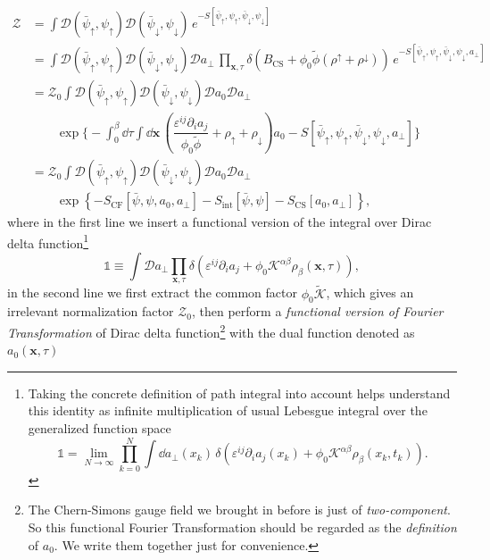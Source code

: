 \documentclass[bachelor,english,numbers]{ustcthesis}
\begin{document}
		\begin{align}
			\mathcal{Z}&=\int \mathcal{D}(\bar{\psi}_\uparrow,\psi_\uparrow)\mathcal{D}(\bar{\psi}_\downarrow,\psi_\downarrow)\,e^{-S[\bar{\psi}_\uparrow,\psi_\uparrow,\bar{\psi}_\downarrow,\psi_\downarrow]}\nonumber\\
			&=\int\mathcal{D}(\bar{\psi}_\uparrow,\psi_\uparrow)\mathcal{D}(\bar{\psi}_\downarrow,\psi_\downarrow)\mathcal{D}a_{\perp}\,\prod_{\bm{x},\tau}\delta\left(B_{\text{CS}}+\phi_0\widetilde{\phi}(\rho^\uparrow+\rho^\downarrow)\right)\,e^{-S[\bar{\psi}_\uparrow,\psi_\uparrow,\bar{\psi}_\downarrow,\psi_\downarrow,a_\perp]}\nonumber\\
			&=\mathcal{Z}_0\int\mathcal{D}(\bar{\psi}_\uparrow,\psi_\uparrow)\mathcal{D}(\bar{\psi}_\downarrow,\psi_\downarrow)\mathcal{D}a_0\mathcal{D}a_{\perp}\nonumber\\
			&\qquad\exp \bigg\{-\int_0^\beta\dd\tau\int\dd\bm{x}\,\left(\dfrac{\varepsilon^{ij}\partial_i a_j}{\phi_0\widetilde{\phi}}+\rho_\uparrow+\rho_\downarrow\right)a_0-S[\bar{\psi}_\uparrow,\psi_\uparrow,\bar{\psi}_\downarrow,\psi_\downarrow,a_\perp]\bigg\}\nonumber\\
			&=\mathcal{Z}_0\int\mathcal{D}(\bar{\psi}_\uparrow,\psi_\uparrow)\mathcal{D}(\bar{\psi}_\downarrow,\psi_\downarrow)\mathcal{D}a_0\mathcal{D}a_{\perp}\nonumber\\
			&\qquad\exp \left\{-S_{\text{CF}}[\bar{\psi},\psi,a_0,a_{\perp}]-S_{\text{int}}[\bar{\psi},\psi]-S_{\text{CS}}[a_0,a_{\perp}]\right\},\label{2.3.1}
		\end{align}
		where in the first line we insert a functional version of the integral over Dirac delta function\footnote{Taking the concrete definition of path integral into account helps understand this identity as infinite multiplication of usual Lebesgue integral over the generalized function space
		\begin{equation*}
			\mathds{1}=\lim_{N\rightarrow \infty}\prod_{k=0}^N\int\dd a_{\perp}(x_k)\,\delta(\varepsilon^{ij} \partial_i a_j(x_k)+\phi_0 \mathcal{K}^{\alpha \beta}\rho_{\beta}(x_k,t_k) ).
		\end{equation*}}
		\begin{equation*}
			\mathds{1}\equiv\int\mathcal{D}a_{\perp}\prod_{\bm{x},\tau}\delta(\varepsilon^{ij}\partial_i a_j+\phi_0\mathcal{K}^{\alpha \beta}\rho_\beta(\bm{x},\tau)),
		\end{equation*}
		in the second line we first extract the common factor $\phi_0\widetilde{\mathcal{K}}$, which gives an irrelevant normalization factor $\mathcal{Z}_0$, then perform a \emph{functional version of Fourier Transformation} of Dirac delta function\footnote{The Chern-Simons gauge field we brought in before is just of \emph{two-component}. So this functional Fourier Transformation should be regarded as the \emph{definition} of $a_0$. We write them together just for convenience.} with the dual function denoted as $a_0(\bm{x},\tau)$
\end{document}
